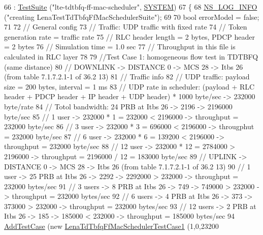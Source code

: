 \begin{DoxyCode}
66   : \hyperlink{classns3_1_1TestSuite_a904b0c40583b744d30908aeb94636d1a}{TestSuite} (\textcolor{stringliteral}{"lte-tdtbfq-ff-mac-scheduler"}, \hyperlink{classns3_1_1TestSuite_a1ebfcab34ec8161e085e8e3a1855eae0a90c5529a26ab3a5ffcc6e57040dbd82e}{SYSTEM})
67 \{
68   \hyperlink{group__logging_gafbd73ee2cf9f26b319f49086d8e860fb}{NS\_LOG\_INFO} (\textcolor{stringliteral}{"creating LenaTestTdTbfqFfMacSchedulerSuite"});
69 
70   \textcolor{keywordtype}{bool} errorModel = \textcolor{keyword}{false};
71 
72   \textcolor{comment}{// General config}
73   \textcolor{comment}{// Traffic: UDP traffic with fixed rate}
74   \textcolor{comment}{// Token generation rate = traffic rate}
75   \textcolor{comment}{// RLC header length = 2 bytes, PDCP header = 2 bytes}
76   \textcolor{comment}{// Simulation time = 1.0 sec}
77   \textcolor{comment}{// Throughput in this file is calculated in RLC layer}
78 
79   \textcolor{comment}{//Test Case 1: homogeneous flow test in TDTBFQ (same distance)}
80   \textcolor{comment}{// DOWNLINK -> DISTANCE 0 -> MCS 28 -> Itbs 26 (from table 7.1.7.2.1-1 of 36.2    13)}
81   \textcolor{comment}{// Traffic info}
82   \textcolor{comment}{//   UDP traffic: payload size = 200 bytes, interval = 1 ms}
83   \textcolor{comment}{//   UDP rate in scheduler: (payload + RLC header + PDCP header + IP header + UDP header) * 1000 byte/sec
       -> 232000 byte/rate }
84   \textcolor{comment}{// Totol bandwidth: 24 PRB at Itbs 26 -> 2196 -> 2196000 byte/sec}
85   \textcolor{comment}{// 1 user -> 232000 * 1 = 232000 < 2196000 -> throughput = 232000 byte/sec}
86   \textcolor{comment}{// 3 user -> 232000 * 3 = 696000 < 2196000 -> througphut = 232000 byte/sec}
87   \textcolor{comment}{// 6 user -> 232000 * 6 = 139200 < 2196000 -> throughput = 232000 byte/sec}
88   \textcolor{comment}{// 12 user -> 232000 * 12 = 2784000 > 2196000 -> throughput = 2196000 / 12 = 183000 byte/sec}
89   \textcolor{comment}{// UPLINK -> DISTANCE 0 -> MCS 28 -> Itbs 26 (from table 7.1.7.2.1-1 of 36.2    13)}
90   \textcolor{comment}{// 1 user -> 25 PRB at Itbs 26 -> 2292 -> 2292000 > 232000 -> throughput = 232000 bytes/sec}
91   \textcolor{comment}{// 3 users -> 8 PRB at Itbs 26 -> 749 -> 749000 > 232000 -> throughput = 232000 bytes/sec }
92   \textcolor{comment}{// 6 users -> 4 PRB at Itbs 26 -> 373 -> 373000 > 232000 -> throughput = 232000 bytes/sec}
93   \textcolor{comment}{// 12 users -> 2 PRB at Itbs 26 -> 185 -> 185000 < 232000 -> throughput = 185000 bytes/sec}
94   \hyperlink{classns3_1_1TestCase_a3718088e3eefd5d6454569d2e0ddd835}{AddTestCase} (\textcolor{keyword}{new} \hyperlink{classLenaTdTbfqFfMacSchedulerTestCase1}{LenaTdTbfqFfMacSchedulerTestCase1} (1,0,23200

\end{DoxyCode}
